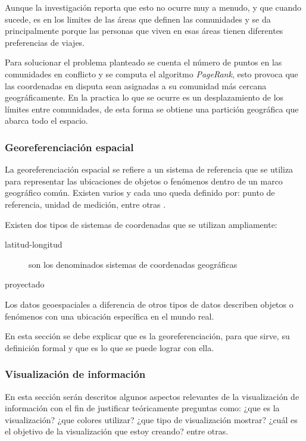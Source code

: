 \documentclass[12pt]{article}
\begin{document}
Aunque la investigación reporta que esto no ocurre muy a menudo, y que cuando sucede, es en los limites de las áreas que definen las comunidades y se da principalmente porque las personas que viven en esas áreas tienen diferentes preferencias de viajes.

Para solucionar el problema planteado se cuenta el número de puntos en las comunidades en conflicto y se computa el algoritmo \textit{PageRank}, esto provoca que las coordenadas en disputa sean asignadas a su comunidad más cercana geográficamente. En la practica lo que se ocurre es un desplazamiento de los límites entre comunidades, de esta forma se obtiene una partición geográfica que abarca todo el espacio.
    
	\subsubsection{Georeferenciación espacial}

La georeferenciación espacial se refiere a un sistema de referencia que se utiliza para representar las ubicaciones de objetos o fenómenos  dentro de un marco geográfico común. Existen varios y cada uno queda definido por: punto de referencia, unidad de medición, entre otras \cite{argis}. 

Existen dos tipos de sistemas de coordenadas que se utilizan ampliamente:

\begin{description}
	\item[latitud-longitud] son los denominados sistemas de coordenadas geográficas 
	\item[proyectado] 
\end{description}



Los datos geoespaciales a diferencia de otros tipos de datos describen objetos o fenómenos con una ubicación específica en el mundo real. 

En esta sección se debe explicar que es la georeferenciación, para que sirve, su definición formal y que es lo que se puede lograr con ella.
    
	\subsubsection{Visualización de información}    
	En esta sección serán descritos algunos aspectos relevantes de la visualización de información con el fin de justificar teóricamente preguntas como: ¿que es la visualización? ¿que colores utilizar? ¿que tipo de visualización mostrar? ¿cuál es el objetivo de la visualización que estoy creando? entre otras. 
	
\end{document}
